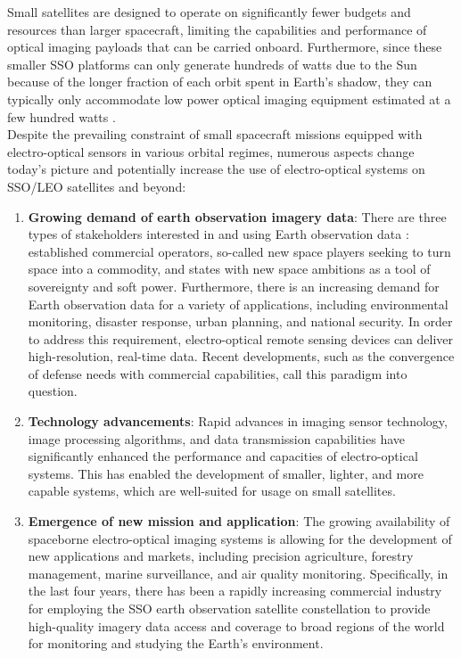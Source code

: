 \documentclass[final,5p,times,sort&compress,twocolumn]{elsarticle}
\begin{document}
Small satellites are designed to operate on significantly fewer budgets and resources than larger spacecraft, limiting the capabilities and performance of optical imaging payloads that can be carried onboard. Furthermore, since these smaller SSO platforms can only generate hundreds of watts due to the Sun because of the longer fraction of each orbit spent in Earth's shadow, they can typically only accommodate low power optical imaging equipment estimated at a few hundred watts \cite{selva2012survey}. \\
Despite the prevailing constraint of small spacecraft missions equipped with electro-optical sensors in various orbital regimes, numerous aspects change today's picture and potentially increase the use of electro-optical systems on SSO/LEO satellites and beyond:
\begin{enumerate}
	\item \textbf{Growing demand of earth observation imagery data}: There are three types of stakeholders interested in and using Earth observation data \cite{denis2017towards}: established commercial operators, so-called new space players seeking to turn space into a commodity, and states with new space ambitions as a tool of sovereignty and soft power. Furthermore, there is an increasing demand for Earth observation data for a variety of applications, including environmental monitoring, disaster response, urban planning, and national security. In order to address this requirement, electro-optical remote sensing devices can deliver high-resolution, real-time data. Recent developments, such as the convergence of defense needs with commercial capabilities, call this paradigm into question. 
	\item \textbf{Technology advancements}: Rapid advances in imaging sensor technology, image processing algorithms, and data transmission capabilities have significantly enhanced the performance and capacities of electro-optical systems. This has enabled the development of smaller, lighter, and more capable systems, which are well-suited for usage on small satellites.
	\item \textbf{Emergence of new mission and application}: The growing availability of spaceborne electro-optical imaging systems is allowing for the development of new applications and markets, including precision agriculture, forestry management, marine surveillance, and air quality monitoring. Specifically, in the last four years, there has been a rapidly increasing commercial industry for employing the SSO earth observation satellite constellation \cite{sandau2010status} to provide high-quality imagery data access and coverage to broad regions of the world for monitoring and studying the Earth's environment.

\end{enumerate}
\end{document}
